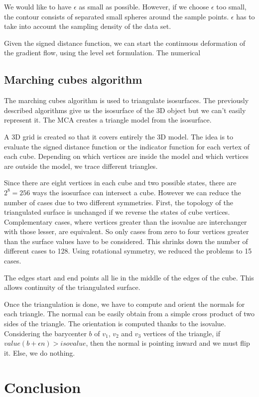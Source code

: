 \documentclass[a4paper]{article}
\begin{document}
We would like to have $\epsilon$ as small as possible. However, if we choose $\epsilon$ too small, the contour consists of separated small spheres around the sample points. $\epsilon$ has to take into account the sampling density of the data set.

Given the signed distance function, we can start the continuous deformation of the gradient flow, using the level set formulation. The numerical %

\subsection{Marching cubes algorithm}
\label{subsec:mca}
The marching cubes algorithm is used to triangulate isosurfaces. The previously described algorithms give us the isosurface of the 3D object but we can't easily represent it. The MCA creates a triangle model from the isosurface.

A 3D grid is created so that it covers entirely the 3D model. The idea is to evaluate the signed distance function or the indicator function for each vertex of each cube. Depending on which vertices are inside the model and which vertices are outside the model, we trace different triangles.

Since there are eight vertices in each cube and two possible states, there are $2^8 = 256$ ways the isosurface can intersect a cube. However we can reduce the number of cases due to two different symmetries. First, the topology of the triangulated surface is unchanged if we reverse the states of cube vertices. Complementary cases, where vertices greater than the isovalue are interchanger with those lesser, are equivalent. So only cases from zero to four vertices greater than the surface values have to be considered. This shrinks down the number of different cases to 128. Using rotational symmetry, we reduced the problems to 15 cases.


The edges start and end points all lie in the middle of the edges of the cube. This allows continuity of the triangulated surface.

Once the triangulation is done, we have to compute and orient the normals for each triangle. The normal can be easily obtain from a simple cross product of two sides of the triangle. The orientation is computed thanks to the isovalue. Considering the barycenter $b$ of $v_1$, $v_2$ and $v_3$ vertices of the triangle, if $value(b + \epsilon n) > isovalue$, then the normal is pointing inward and we must flip it. Else, we do nothing.

\newpage
\section*{Conclusion}

\newpage
{}


\end{document}
